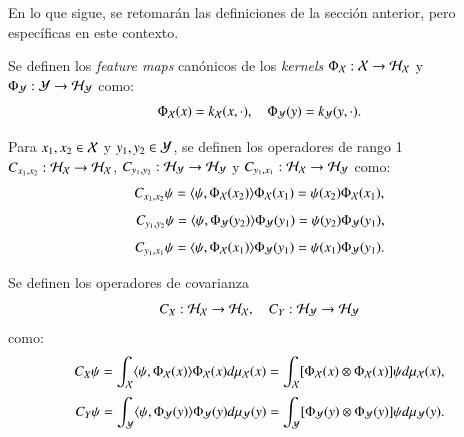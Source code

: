 En lo que sigue, se retomarán las definiciones de la sección anterior, pero específicas en este contexto.

\begin{defn}
	Se definen los \textit{feature maps} canónicos de los \textit{kernels} $\Phi_{\mathcal{X}} : \mathcal{X} \to \mathcal{H}_{\mathcal{X}}$ y $\Phi_{\mathcal{Y}} : \mathcal{Y} \to \mathcal{H}_{\mathcal{Y}}$ como:
	\begin{equation*}
		\Phi_{\mathcal{X}} (x) = k_{\mathcal{X}} (x, \cdot), \quad \Phi_{\mathcal{Y}} (y) = k_{\mathcal{Y}} (y, \cdot).
	\end{equation*}
\end{defn}

\begin{defn}
	Para $x_1, x_2 \in \mathcal{X}$ y $y_1, y_2 \in \mathcal{Y}$, se definen los operadores de rango 1 $C_{x_1,x_2} : \mathcal{H}_{\mathcal{X}} \to \mathcal{H}_{\mathcal{X}}$, $C_{y_1,y_2} : \mathcal{H}_{\mathcal{Y}} \to \mathcal{H}_{\mathcal{Y}}$ y $C_{y_1,x_1} : \mathcal{H}_{\mathcal{X}} \to \mathcal{H}_{\mathcal{Y}}$ como:
	\begin{equation*}
		C_{x_1, x_2} \psi = \langle \psi, \Phi_{\mathcal{X}} (x_2) \rangle \Phi_{\mathcal{X}} (x_1) = \psi (x_2) \Phi_{\mathcal{X}} (x_1),
	\end{equation*}
	\begin{equation*}
		C_{y_1, y_2} \psi = \langle \psi, \Phi_{\mathcal{Y}} (y_2) \rangle \Phi_{\mathcal{Y}} (y_1) = \psi (y_2) \Phi_{\mathcal{Y}} (y_1),
	\end{equation*}
	\begin{equation*}
		C_{y_1, x_1} \psi = \langle \psi, \Phi_{\mathcal{X}} (x_1) \rangle \Phi_{\mathcal{Y}} (y_1) = \psi (x_1) \Phi_{\mathcal{Y}} (y_1).
	\end{equation*}
\end{defn}

\begin{defn}
	Se definen los operadores de covarianza 
    \begin{equation*}
        C_X : \mathcal{H}_{\mathcal{X}} \to \mathcal{H}_{\mathcal{X}}, \quad C_Y : \mathcal{H}_{\mathcal{Y}} \to \mathcal{H}_{\mathcal{Y}}
    \end{equation*} 
    como:
	\begin{equation*}
		C_X \psi = \int_{\mathcal{X}} \langle \psi, \Phi_{\mathcal{X}} (x) \rangle \Phi_{\mathcal{X}} (x) d \mu_{\mathcal{X}} (x) = \int_{\mathcal{X}} [\Phi_{\mathcal{X}} (x) \otimes \Phi_{\mathcal{X}} (x)] \psi d \mu_{\mathcal{X}} (x),
	\end{equation*}
	\begin{equation*}
		C_Y \psi = \int_{\mathcal{Y}} \langle \psi, \Phi_{\mathcal{Y}} (y) \rangle \Phi_{\mathcal{Y}} (y) d \mu_{\mathcal{Y}} (y) = \int_{\mathcal{Y}} [\Phi_{\mathcal{Y}} (y) \otimes \Phi_{\mathcal{Y}} (y)] \psi d \mu_{\mathcal{Y}} (y).
	\end{equation*}
\end{defn}

